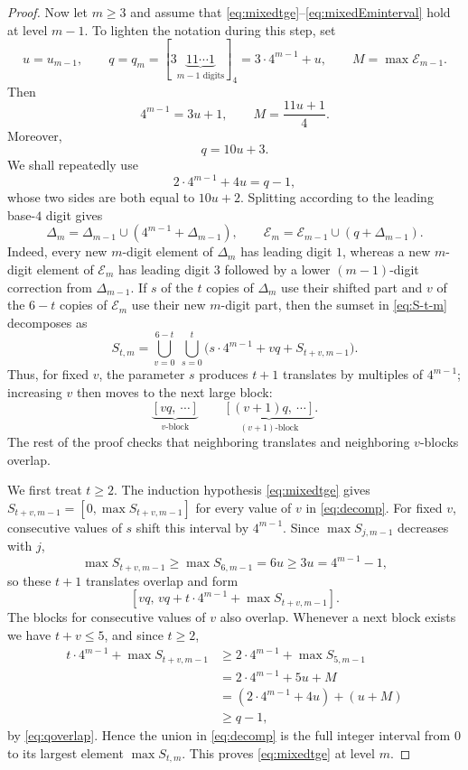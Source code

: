 \documentclass[12pt]{article}
\theoremstyle{plain}
\begin{document}
\begin{proof}
Now let $m\geq3$ and assume that
\eqref{eq:mixedtge}--\eqref{eq:mixedEminterval} hold at level $m-1$.
To lighten the notation during this step, set
\[
 u=u_{m-1},\qquad
 q=q_m=[3\underbrace{11\cdots1}_{m-1\text{ digits}}]_4
      =3\cdot4^{m-1}+u,\qquad
 M=\max\mathcal E_{m-1}.
\]
Then
\[
 4^{m-1}=3u+1,\qquad
 M=\frac{11u+1}{4}.
\]
Moreover,
\begin{equation}\label{eq:qmdef}
 q=10u+3.
\end{equation}
We shall repeatedly use
\begin{equation}\label{eq:qoverlap}
 2\cdot4^{m-1}+4u=q-1,
\end{equation}
whose two sides are both equal to $10u+2$.  Splitting according to the
leading base-$4$ digit gives
\[
 \Delta_m=\Delta_{m-1}\cup(4^{m-1}+\Delta_{m-1}),\qquad
 \mathcal E_{m}=\mathcal E_{m-1}\cup(q+\Delta_{m-1}).
\]
Indeed, every new $m$-digit element of $\Delta_m$ has leading digit $1$,
whereas a new $m$-digit element of $\mathcal E_{m}$ has leading digit $3$
followed by a lower $(m-1)$-digit correction from $\Delta_{m-1}$.  If $s$ of
the $t$ copies of $\Delta_m$ use their shifted part and $v$ of the $6-t$
copies of $\mathcal E_{m}$ use their new $m$-digit part, then the sumset in
\eqref{eq:S-t-m} decomposes as
\begin{equation}\label{eq:decomp}
 S_{t,m}=\bigcup_{v=0}^{6-t}\ \bigcup_{s=0}^{t}
 \bigl(s\cdot4^{m-1}+vq+S_{t+v,m-1}\bigr).
\end{equation}
Thus, for fixed $v$, the parameter $s$ produces $t+1$ translates by
multiples of $4^{m-1}$; increasing $v$ then moves to the next large block:
\[
 \underbrace{[vq,\ \cdots]}_{v\text{-block}}
 \qquad
 \underbrace{[(v+1)q,\ \cdots]}_{(v+1)\text{-block}}.
\]
The rest of the proof checks that neighboring translates and neighboring
$v$-blocks overlap.

We first treat $t\geq2$.  The induction hypothesis
\eqref{eq:mixedtge} gives $S_{t+v,m-1}=[0,\max S_{t+v,m-1}]$ for every
value of $v$ in \eqref{eq:decomp}.  For fixed $v$, consecutive values of
$s$ shift this interval by $4^{m-1}$.  Since $\max S_{j,m-1}$ decreases
with $j$,
\[
 \max S_{t+v,m-1}\geq\max S_{6,m-1}=6u
     \geq3u=4^{m-1}-1,
\]
so these $t+1$ translates overlap and form
\[
 [vq,\,vq+t\cdot4^{m-1}+\max S_{t+v,m-1}].
\]
The blocks for consecutive values of $v$ also overlap.  Whenever a next
block exists we have $t+v\leq5$, and since $t\geq2$,
\[
\begin{aligned}
 t\cdot4^{m-1}+\max S_{t+v,m-1}
 &\geq2\cdot4^{m-1}+\max S_{5,m-1}\\
 &=2\cdot4^{m-1}+5u+M\\
 &=(2\cdot4^{m-1}+4u)+(u+M)\\
 &\geq q-1,
\end{aligned}
\]
by \eqref{eq:qoverlap}.  Hence the union in \eqref{eq:decomp} is the
full integer interval from $0$ to its largest element $\max S_{t,m}$.
This proves \eqref{eq:mixedtge} at level $m$.


\end{proof}
\end{document}
